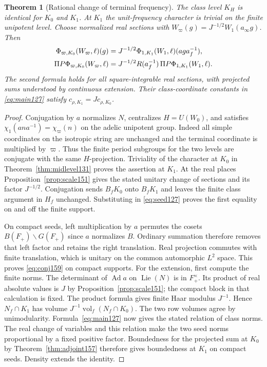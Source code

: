 \documentclass[a4paper,11pt]{article}
\newtheorem{theorem}[proposition]{Theorem}
\theoremstyle{definition}
\theoremstyle{remark}
\numberwithin{equation}{section}
\begin{document}
\begin{theorem}[Rational change of terminal frequency]
\label{thm:conj159}
The class level \(K_H\) is identical for \(K_0\) and \(K_1\).
At \(K_1\) the unit-frequency character is trivial on the
finite unipotent level. Choose normalized real sections with
\(W_\varpi(g)=J^{-1/2}W_1(a_\infty g)\). Then
\begin{align}
   \Phi_{\varpi,K_0}(W_\varpi,\ell)(g)
     &=J^{-1/2}\Phi_{1,K_1}(W_1,\ell)(a g a_f^{-1}),\notag\\
   \Pi P\Phi_{\varpi,K_0}(W_\varpi,\ell)
     &=J^{-1/2}R(a_f^{-1})\,\Pi P\Phi_{1,K_1}(W_1,\ell).
   \label{eq:conj159}
\end{align}
The second formula holds for all square-integrable real
sections, with projected sums understood by continuous
extension. Their class-coordinate constants in
\eqref{eq:main127} satisfy \(c_{\rho,K_1}=Jc_{\rho,K_0}\).
\end{theorem}
\begin{proof}
Conjugation by \(a\) normalizes \(N\), centralizes \(H=U(W_0)\),
and satisfies \(\chi_1(ana^{-1})=\chi_\varpi(n)\) on the
adelic unipotent group. Indeed all simple coordinates on the
isotropic string are unchanged and the terminal coordinate
is multiplied by \(\varpi\). Thus the finite period subgroups
for the two levels are conjugate with the same \(H\)-projection.
Triviality of the character at \(K_0\) in
Theorem~\ref{thm:midlevel131} proves the assertion at \(K_1\).
At the real places Proposition~\ref{prop:scale151} gives the
stated unitary change of sections and its factor \(J^{-1/2}\).
Conjugation sends \(B_fK_0\) onto \(B_fK_1\) and leaves the
finite class argument in \(H_f\) unchanged. Substituting in
\eqref{eq:seed127} proves the first equality on and off the
finite support.

On compact seeds, left multiplication by \(a\) permutes the
cosets \(B(F_+)\backslash G(F_+)\) since \(a\) normalizes
\(B\). Ordinary summation therefore removes that left factor
and retains the right translation. Real projection commutes
with finite translation, which is unitary on the common
automorphic \(L^2\) space. This proves \eqref{eq:conj159}
on compact supports. For the extension, first compute the
finite norms. The determinant of \(\operatorname{Ad}a\) on
\(\operatorname{Lie}(N)\) is in \(F_+^\times\). Its product
of real absolute values is \(J\) by
Proposition~\ref{prop:scale151}; the compact block in that
calculation is fixed. The product formula gives finite Haar
modulus \(J^{-1}\). Hence \(N_f\cap K_1\) has volume
\(J^{-1}\operatorname{vol}_f(N_f\cap K_0)\). The two row
volumes agree by unimodularity. Formula~\eqref{eq:main127}
now gives the stated relation of class norms. The real change
of variables and this relation make the two seed norms
proportional by a fixed positive factor. Boundedness for the
projected sum at \(K_0\) by Theorem~\ref{thm:adjoint157}
therefore gives boundedness at \(K_1\) on compact seeds.
Density extends the identity.
\end{proof}
\end{document}
